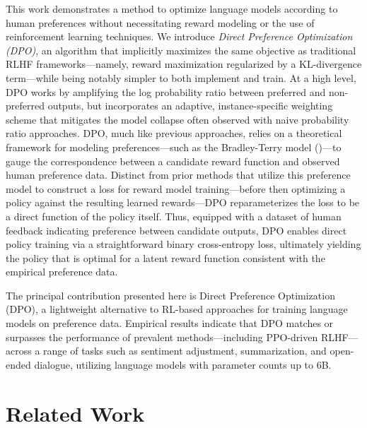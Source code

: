 This work demonstrates a method to optimize language models according to human preferences without necessitating reward modeling or the use of reinforcement learning techniques. We introduce \textit{{Direct Preference Optimization} (DPO)}, an algorithm that implicitly maximizes the same objective as traditional RLHF frameworks—namely, reward maximization regularized by a KL-divergence term—while being notably simpler to both implement and train. At a high level, DPO works by amplifying the log probability ratio between preferred and non-preferred outputs, but incorporates an adaptive, instance-specific weighting scheme that mitigates the model collapse often observed with naive probability ratio approaches. DPO, much like previous approaches, relies on a theoretical framework for modeling preferences—such as the Bradley-Terry model (\cite{bradley1952rankanalysis})—to gauge the correspondence between a candidate reward function and observed human preference data. Distinct from prior methods that utilize this preference model to construct a loss for reward model training—before then optimizing a policy against the resulting learned rewards—DPO reparameterizes the loss to be a direct function of the policy itself. Thus, equipped with a dataset of human feedback indicating preference between candidate outputs, DPO enables direct policy training via a straightforward binary cross-entropy loss, ultimately yielding the policy that is optimal for a latent reward function consistent with the empirical preference data.

The principal contribution presented here is Direct Preference Optimization (DPO), a lightweight alternative to RL-based approaches for training language models on preference data. Empirical results indicate that DPO matches or surpasses the performance of prevalent methods—including PPO-driven RLHF—across a range of tasks such as sentiment adjustment, summarization, and open-ended dialogue, utilizing language models with parameter counts up to 6B.

\section{Related Work}

